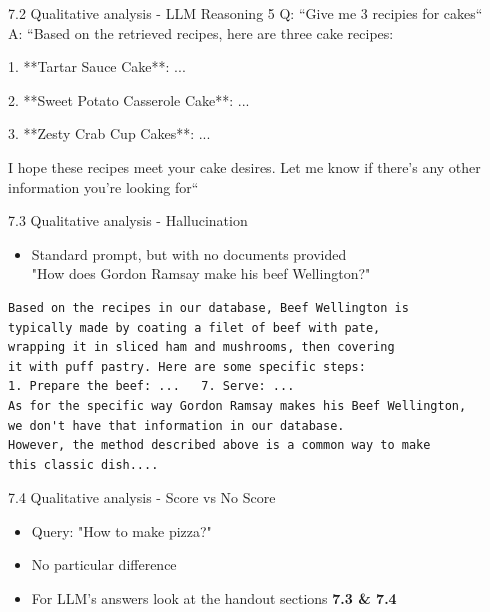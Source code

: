 \documentclass{beamer}
\begin{document}
\begin{frame}{7.2 Qualitative analysis - LLM Reasoning 5}
  Q: ``Give me 3 recipies for cakes``\\
  A: ``Based on the retrieved recipes, here are three cake recipes:

  1. **Tartar Sauce Cake**: ...

  2. **Sweet Potato Casserole Cake**: ...

  3. **Zesty Crab Cup Cakes**: ...

  I hope these recipes meet your cake desires. Let me know if there's any other information you're looking for``
\end{frame}

\begin{frame}[fragile]{7.3 Qualitative analysis - Hallucination}
  \begin{itemize}
    \item Standard prompt, but with no documents provided \\
          "How does Gordon Ramsay make his beef Wellington?"
  \end{itemize}
  \begin{verbatim}
Based on the recipes in our database, Beef Wellington is 
typically made by coating a filet of beef with pate,
wrapping it in sliced ham and mushrooms, then covering 
it with puff pastry. Here are some specific steps:
1. Prepare the beef: ...   7. Serve: ...
As for the specific way Gordon Ramsay makes his Beef Wellington,
we don't have that information in our database.
However, the method described above is a common way to make
this classic dish....
  \end{verbatim}
\end{frame}

\begin{frame}{7.4 Qualitative analysis - Score vs No Score}
  \begin{itemize}
    \item Query: "How to make pizza?"
    \item No particular difference
    \item For LLM's answers look at the handout sections \textbf{7.3 \& 7.4}
  \end{itemize}
\end{frame}
\end{document}
